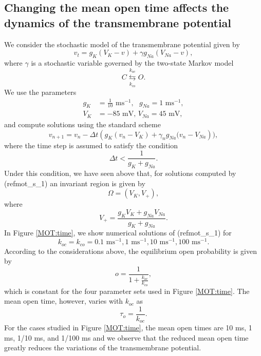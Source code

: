 \subsection[Changing MOT affects the dynamics of the transmembrane potential]{Changing the mean open time affects the dynamics of the transmembrane potential}
We consider the stochastic model of the transmembrane potential given by
\begin{equation}
v_{t}=g_{K}(V_{K}-v)+\gamma g_{Na}(V_{Na}-v) \label{mot_s_1},
\end{equation}
where $\gamma$ is a stochastic variable governed by the two-state Markov
model
\[
C\underset{k_{co}}{\overset{k_{oc}}{\leftrightarrows}}O.
\]
We use the parameters
\begin{align}
g_{K}  &  =\frac{1}{10}\text{ ms}^{-1},\text{ }g_{Na}=1\text{ ms}
^{-1}, \label{mmm_dta}\\
V_{K} &  =-85\text{ mV, }V_{Na}=45\text{ mV,}\nonumber
\end{align}
and compute solutions using the standard scheme
\begin{equation}
v_{n+1}=v_{n}-\Delta t\left(  g_{K}\left(  v_{n}-V_{K}\right)  +\gamma
_{n}g_{Na}(v_{n}-V_{Na}\right)  ), \label{mot_vs}
\end{equation}
where the time step is assumed to satisfy the condition
\begin{equation}
\Delta t<\frac{1}{g_{K}+g_{Na}}.
\end{equation}
Under this condition, we have seen above that, for solutions computed by
(ref{mot_s_1}) an invariant region is given by
\begin{equation}
\Omega=\left(  V_{K},V_{+}\right)  ,
\end{equation}
where
\[
V_{+}=\frac{g_{K}V_{K}+g_{Na}V_{Na}}{g_{K}+g_{Na}}.
\]
In Figure \ref{MOT:time}, we show numerical solutions of (ref{mot_s_1})
for
\[
k_{oc}=k_{co}=0.1\text{ ms}^{-1},1\text{ ms}^{-1}, 10\text{ ms}^{-1}, 100 \text{ ms}^{-1}.
\]
According to the considerations above, the equilibrium open probability is
given by
\[
o=\frac{1}{1+\frac{k_{oc}}{k_{co}}},
\]
which is constant for the four parameter sets used in Figure \ref{MOT:time}. The mean
open time, however, varies with $k_{oc}$ as
\[
\tau_{o}=\frac{1}{k_{oc}}.
\]
For the cases studied in Figure \ref{MOT:time}, the mean open times are 
10 ms, 1 ms, 1/10 ms, and 1/100 ms and we observe that the reduced mean open time greatly 
reduces the variations of the transmembrane potential.

